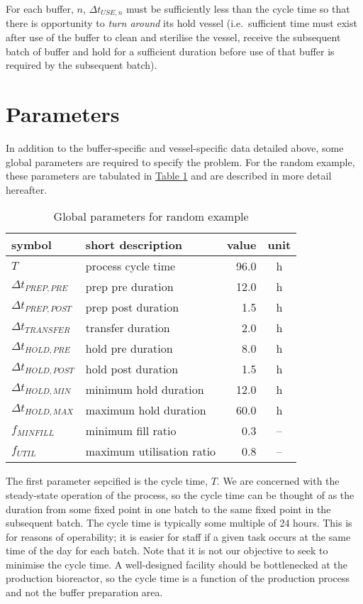 For each buffer, $n$, $\Delta t_{\mathit{USE},n}$ must be sufficiently less
than the cycle time so that there is opportunity to \emph{turn around} its hold
vessel (i.e.\ sufficient time must exist after use of the buffer to clean and
sterilise the vessel, receive the subsequent batch of buffer and hold for a
sufficient duration before use of that buffer is required by the subsequent
batch).

\section{Parameters}\label{S.parameters}

In addition to the buffer-specific and vessel-specific data detailed above,
some global parameters are required to specify the problem.
For the random example, these parameters are tabulated in
\hyperref[tbl.parameters]{Table \ref*{tbl.parameters}} and are described in
more detail hereafter.

\begin{table}[h!]
    \centering
    \caption{Global parameters for random example}
    \label{tbl.parameters}
    \begin{tabular}{l | l | r | c}
        symbol & short description & value & unit\\ \hline
        $T$ & process cycle time & 96.0 & h\\
        $\Delta t_{\mathit{PREP,PRE}}$ & prep pre duration & 12.0 & h\\
        $\Delta t_{\mathit{PREP,POST}}$ & prep post duration & 1.5 & h\\
        $\Delta t_{\mathit{TRANSFER}}$ & transfer duration & 2.0 & h\\
        $\Delta t_{\mathit{HOLD,PRE}}$ & hold pre duration & 8.0 & h\\
        $\Delta t_{\mathit{HOLD,POST}}$ & hold post duration & 1.5 & h\\
        $\Delta t_{\mathit{HOLD,MIN}}$ & minimum hold duration & 12.0 & h\\
        $\Delta t_{\mathit{HOLD,MAX}}$ & maximum hold duration & 60.0 & h\\
        $f_{\mathit{MINFILL}}$ & minimum fill ratio & 0.3 & --\\
        $f_{\mathit{UTIL}}$ & maximum utilisation ratio & 0.8 & --\\
    \end{tabular}
\end{table}

The first parameter sepcified is the cycle time, $T$.  We are concerned
with the steady-state operation of the process, so the cycle time can be
thought of as the duration from some fixed point in one batch to the same
fixed point in the subsequent batch.
The cycle time is typically some multiple of 24 hours.
This is for reasons of operability; it is easier for staff if a given task
occurs at the same time of the day for each batch.
Note that it is not our objective to seek to minimise the cycle time.
A well-designed facility should be bottlenecked at the production bioreactor,
so the cycle time is a function of the production process and not the buffer
preparation area.

